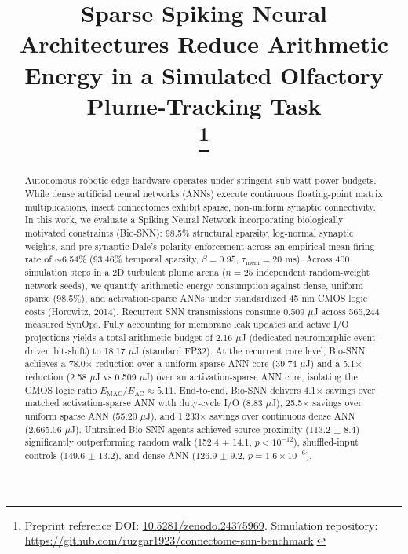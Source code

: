 \documentclass[conference]{IEEEtran}
\begin{document}
\title{Sparse Spiking Neural Architectures Reduce Arithmetic Energy in a Simulated Olfactory Plume-Tracking Task\\
\thanks{Preprint reference DOI: \href{https://doi.org/10.5281/zenodo.24375969}{10.5281/zenodo.24375969}. Simulation repository: \url{https://github.com/ruzgar1923/connectome-snn-benchmark}.}
}

\author{
}

\maketitle

\begin{abstract}
Autonomous robotic edge hardware operates under stringent sub-watt power budgets. While dense artificial neural networks (ANNs) execute continuous floating-point matrix multiplications, insect connectomes exhibit sparse, non-uniform synaptic connectivity. In this work, we evaluate a Spiking Neural Network incorporating biologically motivated constraints (Bio-SNN): 98.5\% structural sparsity, log-normal synaptic weights, and pre-synaptic Dale's polarity enforcement across an empirical mean firing rate of $\sim$6.54\% (93.46\% temporal sparsity, $\beta = 0.95$, $\tau_{\text{mem}} = 20$ ms). Across 400 simulation steps in a 2D turbulent plume arena ($n = 25$ independent random-weight network seeds), we quantify arithmetic energy consumption against dense, uniform sparse (98.5\%), and activation-sparse ANNs under standardized 45 nm CMOS logic costs (Horowitz, 2014). Recurrent SNN transmissions consume 0.509 $\mu$J across 565,244 measured SynOps. Fully accounting for membrane leak updates and active I/O projections yields a total arithmetic budget of 2.16 $\mu$J (dedicated neuromorphic event-driven bit-shift) to 18.17 $\mu$J (standard FP32). At the recurrent core level, Bio-SNN achieves a 78.0$\times$ reduction over a uniform sparse ANN core (39.74 $\mu$J) and a 5.1$\times$ reduction (2.58 $\mu$J vs 0.509 $\mu$J) over an activation-sparse ANN core, isolating the CMOS logic ratio $E_{\text{MAC}} / E_{\text{AC}} \approx 5.11$. End-to-end, Bio-SNN delivers 4.1$\times$ savings over matched activation-sparse ANN with duty-cycle I/O (8.83 $\mu$J), 25.5$\times$ savings over uniform sparse ANN (55.20 $\mu$J), and 1,233$\times$ savings over continuous dense ANN (2,665.06 $\mu$J). Untrained Bio-SNN agents achieved source proximity (113.2 $\pm$ 8.4) significantly outperforming random walk (152.4 $\pm$ 14.1, $p < 10^{-12}$), shuffled-input controls (149.6 $\pm$ 13.2), and dense ANN (126.9 $\pm$ 9.2, $p = 1.6 \times 10^{-6}$).
\end{abstract}
\end{document}
